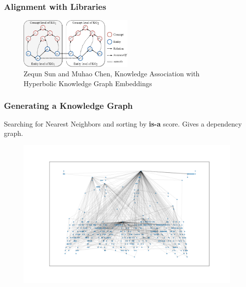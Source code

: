 \documentclass[10pt]{beamer}
\begin{document}
\begin{frame}
    \frametitle{Alignment with Libraries}
            \begin{figure}
                \centering
                \includegraphics[width=0.5\textwidth]{../Images/example.png}
                \caption{Zequn Sun and Muhao Chen, Knowledge Association with Hyperbolic Knowledge Graph Embeddings}
            \end{figure}
\end{frame}

\begin{frame}
    \frametitle{Generating a Knowledge Graph}
    Searching for Nearest Neighbors and sorting by \textbf{is-a} score. Gives a dependency graph.
            \begin{figure}
                \centering
                \includegraphics[width=0.99\textwidth]{../Images/number_theory_dgraph.png}
            \end{figure}
\end{frame}
\end{document}
